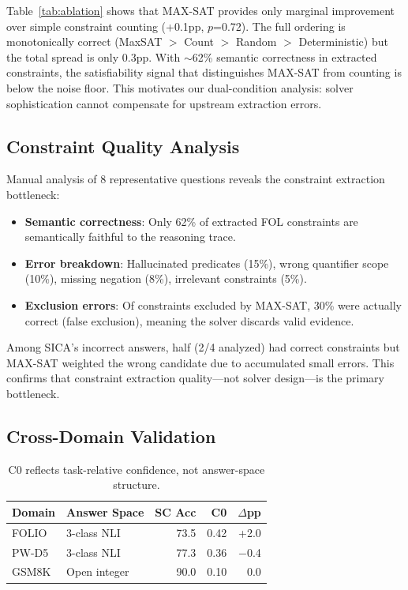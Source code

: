 \documentclass[11pt,a4paper]{article}
\begin{document}
Table~\ref{tab:ablation} shows that MAX-SAT provides only marginal improvement over simple constraint counting (+0.1pp, $p$=0.72). The full ordering is monotonically correct (MaxSAT $>$ Count $>$ Random $>$ Deterministic) but the total spread is only 0.3pp. With $\sim$62\% semantic correctness in extracted constraints, the satisfiability signal that distinguishes MAX-SAT from counting is below the noise floor. This motivates our dual-condition analysis: solver sophistication cannot compensate for upstream extraction errors.

\subsection{Constraint Quality Analysis}

Manual analysis of 8 representative questions reveals the constraint extraction bottleneck:

\begin{itemize}
\item \textbf{Semantic correctness}: Only 62\% of extracted FOL constraints are semantically faithful to the reasoning trace.
\item \textbf{Error breakdown}: Hallucinated predicates (15\%), wrong quantifier scope (10\%), missing negation (8\%), irrelevant constraints (5\%).
\item \textbf{Exclusion errors}: Of constraints excluded by MAX-SAT, 30\% were actually correct (false exclusion), meaning the solver discards valid evidence.
\end{itemize}

Among SICA's incorrect answers, half (2/4 analyzed) had correct constraints but MAX-SAT weighted the wrong candidate due to accumulated small errors. This confirms that constraint extraction quality---not solver design---is the primary bottleneck.

\subsection{Cross-Domain Validation}

\begin{table}[t]
\centering
\small
\caption{C0 reflects task-relative confidence, not answer-space structure.}
\label{tab:crossdomain}
\begin{tabular}{llrrr}
\toprule
\textbf{Domain} & \textbf{Answer Space} & \textbf{SC Acc} & \textbf{C0} & \textbf{$\Delta$pp} \\
\midrule
FOLIO & 3-class NLI & 73.5 & 0.42 & +2.0 \\
PW-D5 & 3-class NLI & 77.3 & 0.36 & $-$0.4 \\
GSM8K & Open integer & 90.0 & 0.10 & 0.0 \\
\bottomrule
\end{tabular}
\end{table}
\end{document}
